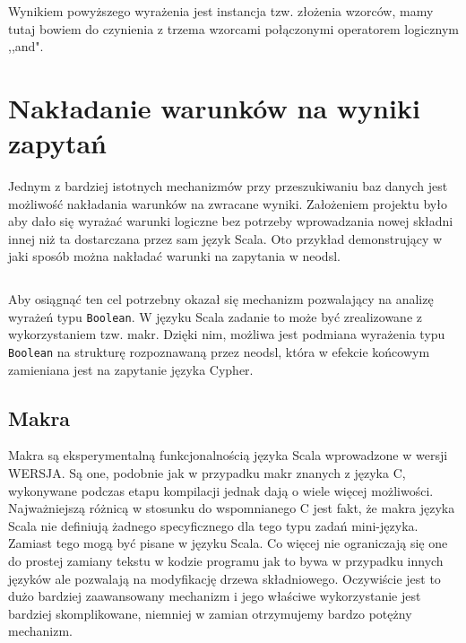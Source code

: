 \documentclass[brudnopis]{xmgr}
\begin{document}
Wynikiem powyższego wyrażenia jest instancja tzw. złożenia wzorców, mamy tutaj bowiem do czynienia z trzema wzorcami połączonymi operatorem logicznym ,,and". 

\section{Nakładanie warunków na wyniki zapytań}

Jednym z bardziej istotnych mechanizmów przy przeszukiwaniu baz danych jest możliwość nakładania warunków na zwracane wyniki. Założeniem projektu było aby dało się wyrażać warunki logiczne bez potrzeby wprowadzania nowej składni innej niż ta dostarczana przez sam język Scala. Oto przykład demonstrujący w jaki sposób można nakładać warunki na zapytania w neodsl.

\inputminted{scala}{listings/scala/dsl/query-with-simple-condition.scala}

Aby osiągnąć ten cel potrzebny okazał się mechanizm pozwalający na analizę wyrażeń typu \texttt{Boolean}. W języku Scala zadanie to może być zrealizowane z wykorzystaniem tzw. makr. 
Dzięki nim, możliwa jest podmiana wyrażenia typu \texttt{Boolean} na strukturę rozpoznawaną przez neodsl, która w efekcie końcowym zamieniana jest na zapytanie języka Cypher.

\subsection{Makra}

Makra są eksperymentalną funkcjonalnością języka Scala wprowadzone w wersji WERSJA. Są one, podobnie jak w przypadku makr znanych z języka C, wykonywane podczas etapu kompilacji jednak dają o wiele więcej możliwości. Najważniejszą różnicą w stosunku do wspomnianego C jest fakt, że makra języka Scala nie definiują żadnego specyficznego dla tego typu zadań mini-języka. Zamiast tego mogą być pisane w języku Scala. Co więcej nie ograniczają się one do prostej zamiany tekstu w kodzie programu jak to bywa w przypadku innych języków ale pozwalają na modyfikację drzewa składniowego. Oczywiście jest to dużo bardziej zaawansowany mechanizm i jego właściwe wykorzystanie jest bardziej skomplikowane, niemniej w zamian otrzymujemy bardzo potężny mechanizm.
\end{document}
